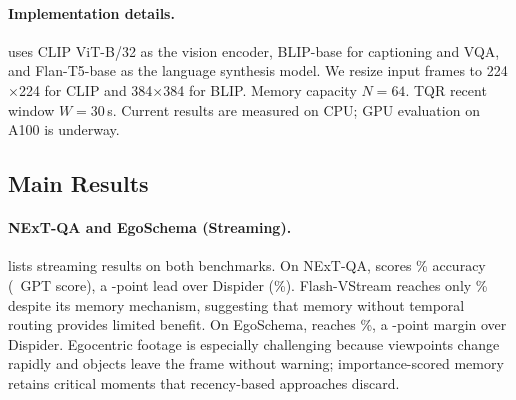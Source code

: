 \paragraph{Implementation details.}
\ours uses CLIP ViT-B/32 as the vision encoder, BLIP-base for captioning and VQA, and Flan-T5-base as the language synthesis model.
We resize input frames to 224$\times$224 for CLIP and 384$\times$384 for BLIP. Memory capacity $N\!=\!64$. TQR recent window $W\!=\!30$\,s.
Current results are measured on CPU; GPU evaluation on A100 is underway.


\subsection{Main Results}

\paragraph{NExT-QA and EgoSchema (Streaming).}
 lists streaming results on both benchmarks.
On NExT-QA, \ours scores \tbd\% accuracy (\tbd\ GPT score), a \tbd-point lead over Dispider (\tbd\%).
Flash-VStream reaches only \tbd\% despite its memory mechanism, suggesting that memory without temporal routing provides limited benefit.
On EgoSchema, \ours reaches \tbd\%, a \tbd-point margin over Dispider.
Egocentric footage is especially challenging because viewpoints change rapidly and objects leave the frame without warning; importance-scored memory retains critical moments that recency-based approaches discard.

